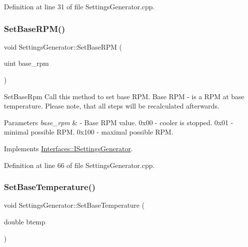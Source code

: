 Definition at line 31 of file Settings\+Generator.\+cpp.

\mbox{\label{class_settings_generator_a1c1960b9021f7081b4c42c4d7c0eda34}} 
\subsubsection{\texorpdfstring{Set\+Base\+R\+P\+M()}{SetBaseRPM()}}
{\footnotesize\ttfamily void Settings\+Generator\+::\+Set\+Base\+R\+PM (\begin{DoxyParamCaption}\item[{uint}]{base\+\_\+rpm }\end{DoxyParamCaption})\hspace{0.3cm}{\ttfamily [virtual]}}



Set\+Base\+Rpm Call this method to set base R\+PM. Base R\+PM -\/ is a R\+PM at base temperature. Please note, that all steps will be recalculated afterwards. 


\begin{DoxyParams}{Parameters}
{\em base\+\_\+rpm} & -\/ Base R\+PM value. 0x00 -\/ cooler is stopped. 0x01 -\/ minimal possible R\+PM. 0x100 -\/ maximal possible R\+PM. \\
\hline
\end{DoxyParams}


Implements \hyperlink{class_interfaces_1_1_i_settings_generator_a4caf07447d0930440d9f21318892244c}{Interfaces\+::\+I\+Settings\+Generator}.



Definition at line 66 of file Settings\+Generator.\+cpp.

\mbox{\label{class_settings_generator_aed9e7acb30bfd559b1ac70ceeddd8973}} 
\subsubsection{\texorpdfstring{Set\+Base\+Temperature()}{SetBaseTemperature()}}
{\footnotesize\ttfamily void Settings\+Generator\+::\+Set\+Base\+Temperature (\begin{DoxyParamCaption}\item[{double}]{btemp }\end{DoxyParamCaption})\hspace{0.3cm}{\ttfamily [virtual]}}



